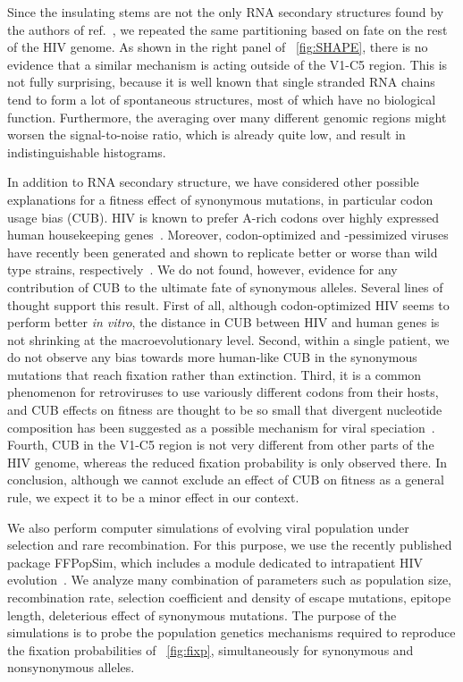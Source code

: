\documentclass[12pt,a4paper,notitlepage,onecolumn]{article}
\begin{document}
Since the insulating stems are not the only RNA secondary structures found by
the authors of ref.~\citep{watts_architecture_2009}, we repeated the same
partitioning based on fate on the rest of the HIV genome. As shown in the right
panel of \figurename~\ref{fig:SHAPE}, there is no evidence that a similar
mechanism is acting outside of the V1-C5 region. This is not fully surprising,
because it is well known that single stranded RNA chains tend to form a lot of
spontaneous structures, most of which have no biological function. Furthermore,
the averaging over many different genomic regions might worsen the
signal-to-noise ratio, which is already quite low, and result in
indistinguishable histograms.

In addition to RNA secondary structure, we have considered other possible
explanations for a fitness effect of synonymous mutations, in particular codon
usage bias (CUB). HIV is known to prefer A-rich codons over highly expressed
human housekeeping genes~\citep{jenkins_extent_2003}. Moreover, codon-optimized
and -pessimized viruses have recently been generated and shown to replicate
better or worse than wild type strains,
respectively~\citep{li_codon-usage-based_2012, ngumbela_quantitative_2008,
coleman_virus_2008}. We do not found, however, evidence for any contribution of
CUB to the ultimate fate of synonymous alleles. Several lines of thought support
this result. First of all, although codon-optimized HIV seems to perform better
{\it in vitro}, the distance in CUB between HIV and human genes is not shrinking
at the macroevolutionary level. Second, within a single patient, we do not
observe any bias towards more human-like CUB in the synonymous mutations that
reach fixation rather than extinction. Third, it is a common phenomenon for
retroviruses to use variously different codons from their hosts, and CUB effects
on fitness are thought to be so small that divergent nucleotide composition has
been suggested as a possible mechanism for viral
speciation~\citep{bronson_nucleotide_1994}. Fourth, CUB in the V1-C5 region is
not very different from other parts of the HIV genome, whereas the reduced
fixation probability is only observed there. In conclusion, although we cannot
exclude an effect of CUB on fitness as a general rule, we expect it to be a
minor effect in our context.

We also perform computer simulations of evolving viral population under
selection and rare recombination. For this purpose, we use the recently
published package FFPopSim, which includes a module dedicated to intrapatient
HIV evolution~\citep{zanini_ffpopsim:_2012}. We analyze many combination of
parameters such as population size, recombination rate, selection coefficient
and density of escape mutations, epitope length, deleterious effect of
synonymous mutations. The purpose of the simulations is to probe the population
genetics mechanisms required to reproduce the fixation probabilities of
\figurename~\ref{fig:fixp}, simultaneously for synonymous and nonsynonymous
alleles.
\end{document}
